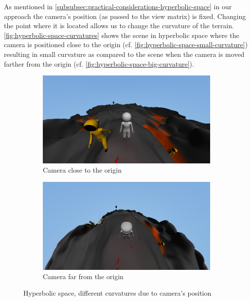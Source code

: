 As mentioned in \autoref{subsubsec:practical-considerations-hyperbolic-space} in our approach the camera's position (as passed to the view matrix) is fixed.
Changing the point where it is located allows us to change the curvature of the terrain.
\autoref{fig:hyperbolic-space-curvatures} shows the scene in hyperbolic space where the camera is positioned close to the origin (cf. \autoref{fig:hyperbolic-space-small-curvature}) resulting in small curvature as compared to the scene when the camera is moved farther from the origin (cf. \autoref{fig:hyperbolic-space-big-curvature}).
\begin{figure}[!htb]
    \centering
    \begin{subfigure}[b]{0.475\textwidth}
        \centering
        \includegraphics[width=\textwidth]{chapters/results/sections/non_euclidean/resources/hyperbolic-small-curvature.png}
        \caption[]%
        {{\small Camera close to the origin}}
        \label{fig:hyperbolic-space-small-curvature}
    \end{subfigure}
    \hfill
    \begin{subfigure}[b]{0.475\textwidth}
        \centering
        \includegraphics[width=\textwidth]{chapters/results/sections/non_euclidean/resources/hyperbolic-large-curvature.png}
        \caption[]%
        {{\small Camera far from the origin}}
        \label{fig:hyperbolic-space-big-curvature}
    \end{subfigure}
    \caption[]
    {\small Hyperbolic space, different curvatures due to camera's position}
    \label{fig:hyperbolic-space-curvatures}
\end{figure}